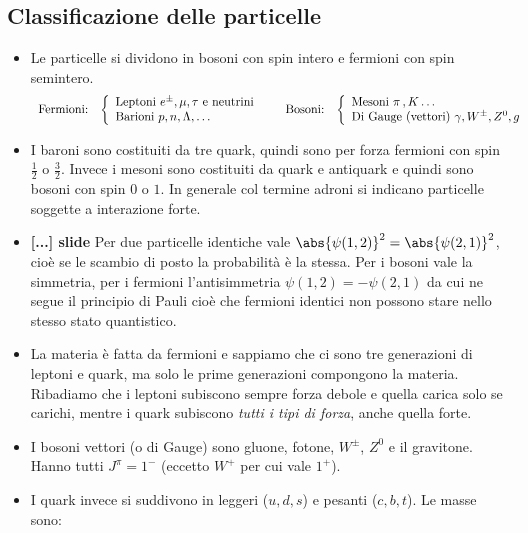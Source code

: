 \subsection{Classificazione delle particelle}
\begin{itemize}
    \item Le particelle si dividono in bosoni con spin intero e fermioni con spin semintero. 
    \[
        \begin{array}{l c c c}
        \text{Fermioni:} & 
        \left\{
        \begin{array}{lll}
        \text{Leptoni } e^\pm,\mu,\tau \text{ e neutrini} \\
        \text{Barioni } p,n,\Lambda,\dots
        \end{array}
        \right.
        & \quad \text{Bosoni:} &
        \left\{
        \begin{array}{lll}
        \text{Mesoni }\pi\,,K\dots \\
        \text{Di Gauge (vettori) } \gamma,W^\pm,Z^0,g
        \end{array}
        \right.
        \end{array}
    \]
    \item I baroni sono costituiti da tre quark, quindi sono per forza fermioni con spin $\frac12$ o $\frac32$. Invece i mesoni sono costituiti da quark e antiquark e quindi sono bosoni con spin $0$ o $1$. In generale col termine adroni si indicano particelle soggette a interazione forte.
    \item \textbf{[...] slide} Per due particelle identiche vale $\abs{\psi(1,2)}^2=\abs{\psi(2,1)}^2$, cioè se le scambio di posto la probabilità è la stessa. Per i bosoni vale la simmetria, per i fermioni l'antisimmetria $\psi(1,2)=-\psi(2,1)$ da cui ne segue il principio di Pauli cioè che fermioni identici non possono stare nello stesso stato quantistico.
    \item La materia è fatta da fermioni e sappiamo che ci sono tre generazioni di leptoni e quark, ma solo le prime generazioni compongono la materia. Ribadiamo che i leptoni subiscono sempre forza debole e quella carica solo se carichi, mentre i quark subiscono \textit{tutti i tipi di forza}, anche quella forte.
    \item I bosoni vettori (o di Gauge) sono gluone, fotone, $W^\pm$, $Z^0$ e il gravitone. Hanno tutti $J^\pi=1^-$ (eccetto $W^+$ per cui vale $1^+$).
    \item I quark invece si suddivono in leggeri ($u,d,s$) e pesanti ($c,b,t$). Le masse sono:
    

\end{itemize}
